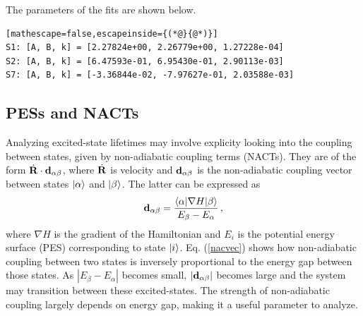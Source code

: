 \documentclass[letterpaper,12pt,titlepage]{article}
\begin{document}
The parameters of the fits are shown below.
\begin{lstlisting}[mathescape=false,escapeinside={(*@}{@*)}]
S1: [A, B, k] = [2.27824e+00, 2.26779e+00, 1.27228e-04]
S2: [A, B, k] = [6.47593e-01, 6.95430e-01, 2.90113e-03]
S7: [A, B, k] = [-3.36844e-02, -7.97627e-01, 2.03588e-03]
\end{lstlisting}

\subsection{PESs and NACTs}
Analyzing excited-state lifetimes may involve explicity looking into the coupling between states, given by non-adiabatic coupling terms (NACTs).  They are of the form $\dot{{\bf{R}}}\cdot {\bf{d}}_{\alpha\beta}$, where $\dot{{\bf{R}}}$ is velocity and ${\bf{d}}_{\alpha\beta}$ is the non-adiabatic coupling vector between states $\ket{\alpha}$ and $\ket{\beta}$.  The latter can be expressed as
\begin{equation}
\label{nacvec}
{\bf{d}}_{\alpha\beta} = \frac{\left<\alpha|\nabla H|\beta\right>}{E_{\beta}-E_{\alpha}}\,,
\end{equation}
where $\nabla H$ is the gradient of the Hamiltonian and $E_{i}$ is the potential energy surface (PES) corresponding to state $\ket{i}$.  Eq. (\ref{nacvec}) shows how non-adiabatic coupling between two states is inversely proportional to the energy gap between those states.  As $|E_{\beta}-E_{\alpha}|$ becomes small, $|{\bf{d}}_{\alpha\beta}|$ becomes large and the system may transition between these excited-states.  The strength of non-adiabatic coupling largely depends on energy gap, making it a useful parameter to analyze.
\end{document}
